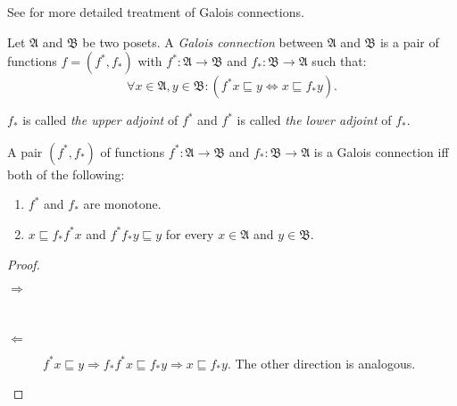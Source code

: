 See \cite{galois-and-fixed,primer-galois} for more detailed treatment
of Galois connections.
\begin{defn}
Let $\mathfrak{A}$ and $\mathfrak{B}$
be two posets. A \emph{Galois connection} between $\mathfrak{A}$
and $\mathfrak{B}$ is a pair of functions $f=(f^{\ast},f_{\ast})$
with $f^{\ast}:\mathfrak{A}\rightarrow\mathfrak{B}$ and $f_{\ast}:\mathfrak{B}\rightarrow\mathfrak{A}$
such that:
\[
\forall x\in\mathfrak{A},y\in\mathfrak{B}:(f^{\ast}x\sqsubseteq y\Leftrightarrow x\sqsubseteq f_{\ast}y).
\]


$f_{\ast}$ is called
\emph{the upper adjoint} of $f^{\ast}$ and $f^{\ast}$ is called
\emph{the lower adjoint} of $f_{\ast}$.\end{defn}
\begin{thm}
\label{galois-second}A pair $(f^{\ast},f_{\ast})$ of functions $f^{\ast}:\mathfrak{A}\rightarrow\mathfrak{B}$
and $f_{\ast}:\mathfrak{B}\rightarrow\mathfrak{A}$ is a Galois connection
iff both of the following: 
\begin{enumerate}
\item \label{galois-second-mono}$f^{\ast}$ and $f_{\ast}$ are monotone.
\item \label{galois-second-ineq}$x\sqsubseteq f_{\ast}f^{\ast}x$ and $f^{\ast}f_{\ast}y\sqsubseteq y$
for every $x\in\mathfrak{A}$ and $y\in\mathfrak{B}$.
\end{enumerate}
\end{thm}
\begin{proof}
~
\begin{description}
\item [{$\Rightarrow$}]~

\item [{$\Leftarrow$}] $f^{\ast}x\sqsubseteq y\Rightarrow f_{\ast}f^{\ast}x\sqsubseteq f_{\ast}y\Rightarrow x\sqsubseteq f_{\ast}y$.
The other direction is analogous.
\end{description}
\end{proof}
